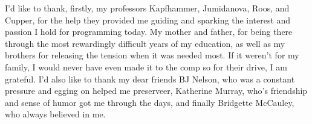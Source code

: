\begin{dedication}

I'd like to thank, firstly, my professors Kapfhammer, Jumidanova, Roos, and Cupper, for the help they provided me guiding and sparking the interest and passion I hold for programming today.  My mother and father, for being there through the most rewardingly difficult years of my education, as well as my brothers for releasing the tension when it was needed most.  If it weren't for my family, I would never have even made it to the comp so for their drive, I am grateful.  I'd also like to thank my dear friends BJ Nelson, who was a constant pressure and egging on helped me preserveer, Katherine Murray, who's friendship and sense of humor got me through the days, and finally Bridgette McCauley, who always believed in me.
\end{dedication}